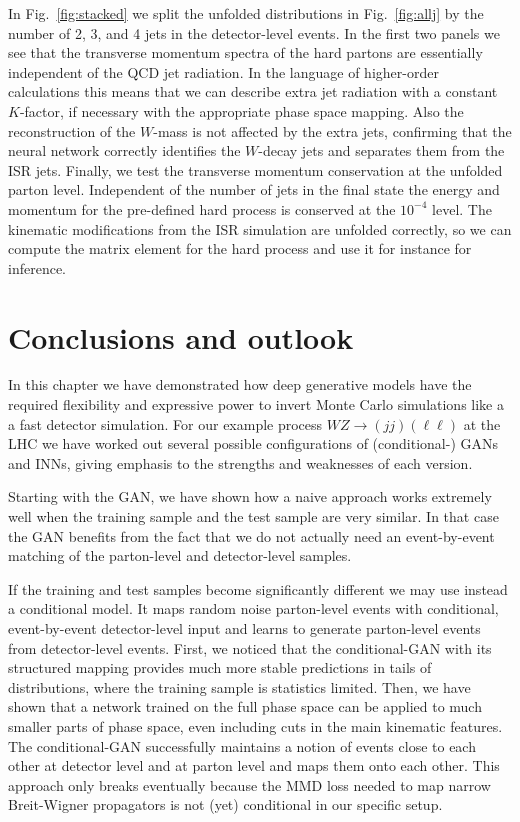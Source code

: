 In Fig.~\ref{fig:stacked} we split the unfolded distributions in
Fig.~\ref{fig:allj} by the number of 2, 3, and 4 jets in the
detector-level events. In the first two panels we see that the
transverse momentum spectra of the hard partons are essentially
independent of the QCD jet radiation. In the language of higher-order
calculations this means that we can describe extra jet radiation with
a constant $K$-factor, if necessary with the appropriate phase space
mapping. Also the reconstruction of the $W$-mass is not affected by
the extra jets, confirming that the neural network correctly
identifies the $W$-decay jets and separates them from the ISR
jets. Finally, we test the transverse momentum conservation at the
unfolded parton level. Independent of the number of jets in the final
state the energy and momentum for the pre-defined hard process is
conserved at the $10^{-4}$ level. The kinematic modifications from the
ISR simulation are unfolded correctly, so we can compute the matrix
element for the hard process and use it for instance for inference.\medskip

\section{Conclusions and outlook}

In this chapter we have demonstrated how deep generative models
have the required flexibility and expressive power to invert Monte
Carlo simulations like a a fast detector simulation.
For our example process $WZ \to (jj) (\ell \ell)$ at the LHC we have
worked out several possible configurations of (conditional-) GANs and INNs,
giving emphasis to the strengths and weaknesses of each version. 

Starting with the GAN, we have shown how a naive approach
works extremely well when the training sample and the test sample are
very similar. In that case the GAN benefits from the fact that we do
not actually need an event-by-event matching of the parton-level and
detector-level samples.

If the training and test samples become significantly different we
may use instead a conditional model. It maps
random noise parton-level events with conditional, event-by-event
detector-level input and learns to generate parton-level events from
detector-level events.  First, we noticed that the conditional-GAN with its
structured mapping provides much more stable predictions in tails of
distributions, where the training sample is statistics limited.  Then,
we have shown that a network trained on the full phase space can be
applied to much smaller parts of phase space, even including cuts in
the main kinematic features. The conditional-GAN successfully maintains a notion
of events close to each other at detector level and at parton level
and maps them onto each other. This approach only breaks eventually
because the MMD loss needed to map narrow Breit-Wigner propagators is
not (yet) conditional in our specific setup.

